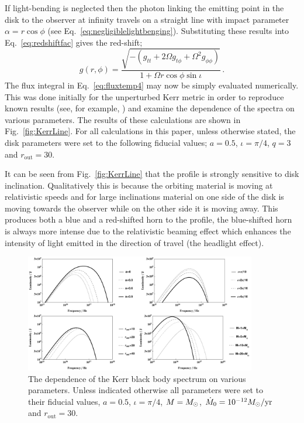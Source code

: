 If light-bending is neglected then the photon linking the emitting point in the disk to the observer at infinity travels on a straight line with impact parameter $\alpha = r\cos\phi $ (see Eq.\ \ref{eq:negligiblelightbenging}). Substituting these results into Eq.\ \ref{eq:redshiftfac} gives the red-shift;
\begin{equation} g\left(r,\phi \right)=\frac{\sqrt{-\left( g_{tt}+2\Omega g_{t\phi}+\Omega^{2}g_{\phi\phi} \right)}}{1+\Omega r \cos \phi \sin \iota} \, . \end{equation}
The flux integral in Eq.\ \ref{eq:fluxtemp4} may now be simply evaluated numerically. This was done initially for the unperturbed Kerr metric in order to reproduce known results (see, for example, \cite{1991MNRAS.250..629K,1991ApJ...376...90L}) and examine the dependence of the spectra on various parameters. The results of these calculations are shown in Fig.\ \ref{fig:KerrLine}. For all calculations in this paper, unless otherwise stated, the disk parameters were set to the following fiducial values; $a=0.5$, $\iota=\pi/4$, $q=3$ and $r_{\textrm{out}}=30$.

It can be seen from Fig.\ \ref{fig:KerrLine} that the profile is strongly sensitive to disk inclination. Qualitatively this is because the orbiting material is moving at relativistic speeds and for large inclinations material on one side of the disk is moving towards the observer while on the other side it is moving away. This produces both a blue and a red-shifted horn to the profile, the blue-shifted horn is always more intense due to the relativistic beaming effect which enhances the intensity of light emitted in the direction of travel (the headlight effect). 

\begin{figure}[t]
 \centering
 \includegraphics[trim=0cm 0cm 0cm 0cm, width=0.9\textwidth]{KerrTherm.pdf}
 \caption{The dependence of the Kerr black body spectrum on various parameters. Unless indicated otherwise all parameters were set to their fiducial values, $a=0.5$, $\iota=\pi/4$, $M=M_{ \odot }$, $\dot{M}_{0}=10^{-12}M_{ \odot }/\textrm{yr}$ and $r_{\textrm{out}}=30$.}
 \label{fig:KerrTherm}
\end{figure}

